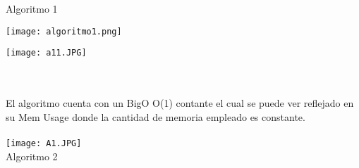 \documentclass{article}
\begin{document}
\large Algoritmo 1\\
\begin{minipage}{0.6\textwidth}
  \centering
  \texttt{[image: algoritmo1.png]}
\end{minipage}
\hfill
\begin{minipage}{0.5\textwidth}
\texttt{[image: a11.JPG]}
\end{minipage}
\\\\
El algoritmo cuenta con un BigO O(1) contante el cual se puede ver reflejado en su Mem Usage donde la cantidad de memoria empleado es constante. 
\\\\
\texttt{[image: A1.JPG]}\\


\newpage
\large Algoritmo 2\\
\end{document}
